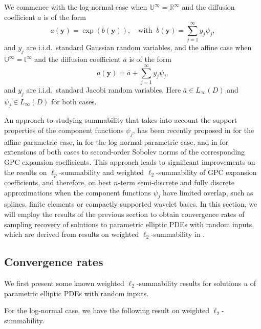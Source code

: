 \documentclass[11pt]{article}
\numberwithin{equation}{section}
\theoremstyle{definition}
\theoremstyle{remark}
\newcommand{\by}{{\boldsymbol{y}}}
\def\IIi{{\mathbb I}^\infty}
\def\UUi{{\mathbb U}^{\infty}}
\def\RRRi{{\mathbb R}^\infty}
\begin{document}
    We commence with the log-normal case when $\UUi= \RRRi$ and the diffusion coefficient $a$ is of the form
 	\begin{equation} \label{lognormal}
 		a(\by)=\exp(b(\by)), \quad {\text{with }}\ b(\by)=\sum_{j = 1}^\infty y_j\psi_j,
 	\end{equation}
 	and $y_j$ are i.i.d.\ standard Gaussian random 
 	variables, and the affine case when $\UUi= \IIi$ and the diffusion coefficient $a$ is of the form
 	\begin{equation} \label{affine}
 		a(\by)= \bar a + \sum_{j = 1}^\infty y_j\psi_j,
 	\end{equation}
 	and $y_j$ are i.i.d.\ standard Jacobi random 
 	variables.
 	Here $\bar a\in L_\infty(D)$ and $\psi_j \in L_\infty(D)$ {for both  cases.}
 	
 	An approach to studying summability that takes into account the 
 	support properties of the component functions $\psi_j$, has been recently proposed in \cite{BCM17} for the affine parametric case, 
 	in \cite{BCDM17} for {the log-normal parametric case}, 
 	and in \cite{BCDC17} for {extensions} of both cases to 
 	second-order Sobolev norms of the corresponding GPC expansion coefficients. 
 	This approach leads to significant improvements
 	on the results on $\ell_p$-summability and weighted $\ell_2$-summability of GPC expansion coefficients, and therefore, 
 	on best $n$-term semi-discrete and fully discrete approximations 
 	when the component functions $\psi_j$ have limited overlap, 
 	such as splines, finite elements or compactly supported wavelet bases. 
 	In this section, we will employ the results of the previous section {to obtain convergence rates} of sampling recovery of solutions to parametric elliptic PDEs with random inputs, which are derived from results on weighted $\ell_2$-summability in \cite{BCDC17,BCM17}. 
 	
 	
 	
 	\subsection{Convergence rates}
 	\label{Convergence rates}
 	{We first present}  some known weighted $\ell_2$-summability 
 	results for solutions $u$ of parametric elliptic PDEs with random inputs.
 	
 	For the log-normal case, we have the following result on weighted $\ell_2$-summability.
 	
\end{document}
